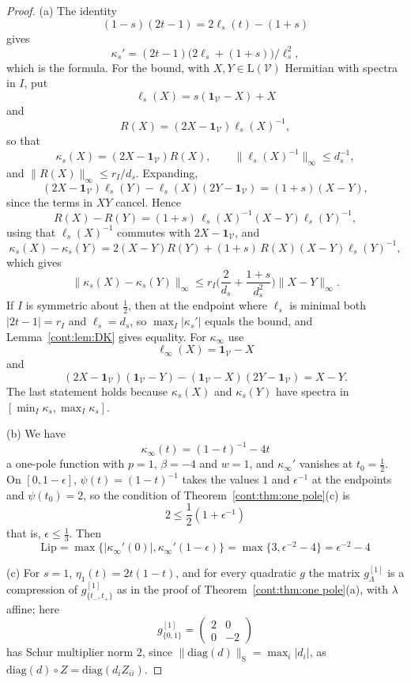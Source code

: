 \begin{proof}
(a) The identity \[(1-s)(2t-1)=2\ell_s(t)-(1+s)\] gives \[\kappa_s'=(2t-1)\big(2\ell_s+(1+s)\big)/\ell_s^2,\] which is the formula. For the bound, with $X,Y\in\mathrm{L}(\mathcal{V})$ Hermitian with spectra in $I$, put \[\ell_s(X)=s(\mathbf{1}_{\mathcal{V}}-X)+X\] and \[R(X)=(2X-\mathbf{1}_{\mathcal{V}})\ell_s(X)^{-1},\] so that \[\kappa_s(X)=(2X-\mathbf{1}_{\mathcal{V}})R(X),\qquad\|\ell_s(X)^{-1}\|_\infty\leq d_s^{-1},\] and $\|R(X)\|_\infty\leq r_I/d_s$. Expanding, \[(2X-\mathbf{1}_{\mathcal{V}})\ell_s(Y)-\ell_s(X)(2Y-\mathbf{1}_{\mathcal{V}})=(1+s)(X-Y),\] since the terms in $XY$ cancel. Hence \[R(X)-R(Y)=(1+s)\,\ell_s(X)^{-1}(X-Y)\ell_s(Y)^{-1},\] using that $\ell_s(X)^{-1}$ commutes with $2X-\mathbf{1}_{\mathcal{V}}$, and
\[
\kappa_s(X)-\kappa_s(Y)=2(X-Y)R(Y)+(1+s)\,R(X)(X-Y)\ell_s(Y)^{-1},
\]
which gives \[\|\kappa_s(X)-\kappa_s(Y)\|_\infty\leq r_I\big(\frac2{d_s}+\frac{1+s}{d_s^2}\big)\|X-Y\|_\infty.\] If $I$ is symmetric about $\frac{1}{2}$, then at the endpoint where $\ell_s$ is minimal both $|2t-1|=r_I$ and $\ell_s=d_s$, so $\max_I|\kappa_s'|$ equals the bound, and Lemma~\ref{cont:lem:DK} gives equality. For $\kappa_\infty$ use \[\ell_\infty(X)=\mathbf{1}_{\mathcal{V}}-X\] and \[(2X-\mathbf{1}_{\mathcal{V}})(\mathbf{1}_{\mathcal{V}}-Y)-(\mathbf{1}_{\mathcal{V}}-X)(2Y-\mathbf{1}_{\mathcal{V}})=X-Y.\] The last statement holds because $\kappa_s(X)$ and $\kappa_s(Y)$ have spectra in $[\min_I\kappa_s,\max_I\kappa_s]$.
 
(b) We have \[\kappa_\infty(t)=(1-t)^{-1}-4t\] a one-pole function with $p=1$, $\beta=-4$ and $w=1$, and $\kappa_\infty'$ vanishes at $t_0=\frac12$. On $[0,1-\epsilon]$, $\psi(t)=(1-t)^{-1}$ takes the values $1$ and $\epsilon^{-1}$ at the endpoints and $\psi(t_0)=2$, so the condition of Theorem~\ref{cont:thm:one pole}(c) is \[2\leq\frac12(1+\epsilon^{-1})\] that is, $\epsilon\leq\frac13$. Then \[\mathrm{Lip}=\max\{|\kappa_\infty'(0)|,\kappa_\infty'(1-\epsilon)\}=\max\{3,\epsilon^{-2}-4\}=\epsilon^{-2}-4\]
 
(c) For $s=1$, $\eta_1(t)=2t(1-t)$, and for every quadratic $g$ the matrix $g^{[1]}_\Lambda$ is a compression of $g^{[1]}_{\{t_-,t_+\}}$ as in the proof of Theorem~\ref{cont:thm:one pole}(a), with $\lambda$ affine; here \[g^{[1]}_{\{0,1\}}=\begin{pmatrix}2&0\\0&-2\end{pmatrix}\] has Schur multiplier norm $2$, since $\|\mathrm{diag}(d)\|_{\mathrm S}=\max_i|d_i|$, as $\mathrm{diag}(d)\circ Z=\mathrm{diag}(d_iZ_{ii})$.


\end{proof}
